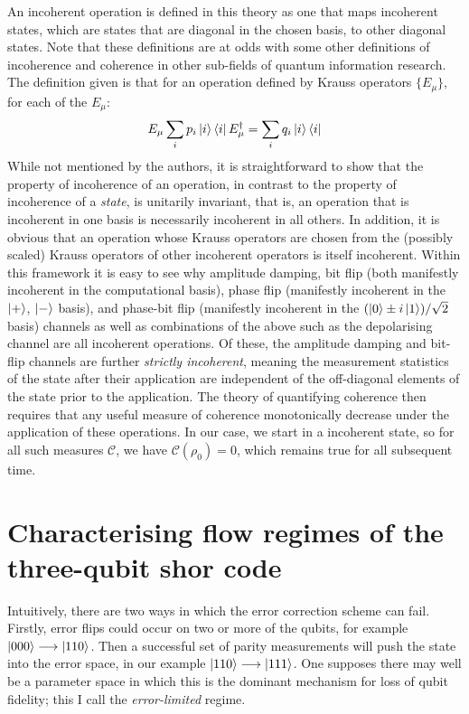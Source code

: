 \documentclass{report}
\begin{document}
\begin{appendices}
An incoherent operation is defined in this theory as one that maps incoherent states, which are states that are diagonal in the chosen basis, to other diagonal states. Note that these definitions are at odds with some other definitions of incoherence and coherence in other sub-fields of quantum information research. The definition given is that for an operation defined by Krauss operators $\{E_\mu\}$, for each of the $E_\mu$:
\begin{equation*}
    E_\mu \sum_i p_i \ket{i}\bra{i} E_\mu^\dag = \sum_i q_i \ket{i}\bra{i}
\end{equation*}
While not mentioned by the authors, it is straightforward to show that the property of incoherence of an operation, in contrast to the property of incoherence of a \textit{state}, is unitarily invariant, that is, an operation that is incoherent in one basis is necessarily incoherent in all others. In addition, it is obvious that an operation whose Krauss operators are chosen from the (possibly scaled) Krauss operators of other incoherent operators is itself incoherent. Within this framework it is easy to see why amplitude damping, bit flip (both manifestly incoherent in the computational basis), phase flip (manifestly incoherent in the $\ket{+}$, $\ket{-}$ basis), and phase-bit flip (manifestly incoherent in the $(\ket{0} \pm i\ket{1})/\sqrt{2}$ basis) channels as well as combinations of the above such as the depolarising channel are all incoherent operations. Of these, the amplitude damping and bit-flip channels are further \textit{strictly incoherent}, meaning the measurement statistics of the state after their application are independent of the off-diagonal elements of the state prior to the application. The theory of quantifying coherence then requires that any useful measure of coherence monotonically decrease under the application of these operations. In our case, we start in a incoherent state, so for all such measures $\mathcal{C}$, we have $\mathcal{C}(\rho_0) = 0$, which remains true for all subsequent time.

\chapter{Characterising flow regimes of the three-qubit shor code}
\label{appendix:flowanalysis}
Intuitively, there are two ways in which the error correction scheme can fail. Firstly, error flips could occur on two or more of the qubits, for example $\ket{000} \longrightarrow \ket{110}$. Then a successful set of parity measurements will push the state into the error space, in our example $\ket{110} \longrightarrow \ket{111}$. One supposes there may well be a parameter space in which this is the dominant mechanism for loss of qubit fidelity; this I call the \textit{error-limited} regime.


\end{appendices}
\end{document}
